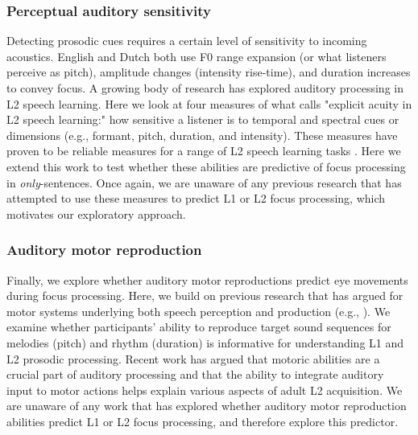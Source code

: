 \subsubsection{Perceptual auditory sensitivity}
Detecting prosodic cues requires a certain level of sensitivity to incoming acoustics. English and Dutch both use F0 range expansion (or what listeners perceive as pitch), amplitude changes (intensity rise-time), and duration increases to convey focus. A growing body of research has explored auditory processing in L2 speech learning. Here we look at four measures of what \cite{saito2023does} calls "explicit acuity in L2 speech learning:" how sensitive a listener is to temporal and spectral cues or dimensions (e.g., formant,
pitch, duration, and intensity). These measures have proven to be reliable measures for a range of L2 speech learning tasks \citep{Kachlicka_Saito_Tierney_2019, saito2024auditory, bakkouche2025effects, bramlett_wiener_24_speechprosody}. Here we extend this work to test whether these abilities are predictive of focus processing in \textit{only}-sentences. Once again, we are unaware of any previous research that has attempted to use these measures to predict L1 or L2 focus processing, which motivates our exploratory approach.


\subsubsection{Auditory motor reproduction}
Finally, we explore whether auditory motor reproductions predict eye movements during focus processing. Here, we build on previous research that has argued for motor systems underlying both speech perception and production (e.g., \cite{liberman1985motor,hickok2011sensorimotor}). We examine whether participants' ability to reproduce target sound sequences for melodies (pitch) and rhythm (duration) is informative for understanding L1 and L2 prosodic processing. Recent work \citep{tierney2014auditory, saito2024auditory,tierney2017individual} has argued that motoric abilities are a crucial part of auditory processing and that the ability to integrate auditory input to motor actions helps explain various aspects of adult L2 acquisition. We are unaware of any work that has explored whether auditory motor reproduction abilities predict L1 or L2 focus processing, and therefore explore this predictor.

